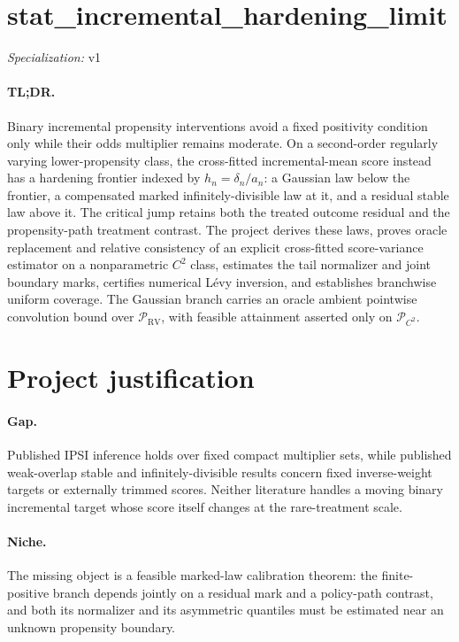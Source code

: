 \documentclass{article}
\begin{document}
\sloppy

\section*{stat\_\allowbreak{}incremental\_\allowbreak{}hardening\_\allowbreak{}limit}

\noindent\textit{Specialization:} v1\par

\paragraph{TL;DR.} Binary incremental propensity interventions avoid a fixed positivity condition only while their odds multiplier remains moderate. On a second-order regularly varying lower-propensity class, the cross-fitted incremental-mean score instead has a hardening frontier indexed by \(h_n=\delta_n/a_n\): a Gaussian law below the frontier, a compensated marked infinitely-divisible law at it, and a residual stable law above it. The critical jump retains both the treated outcome residual and the propensity-path treatment contrast. The project derives these laws, proves oracle replacement and relative consistency of an explicit cross-fitted score-variance estimator on a nonparametric \(C^2\) class, estimates the tail normalizer and joint boundary marks, certifies numerical Lévy inversion, and establishes branchwise uniform coverage. The Gaussian branch carries an oracle ambient pointwise convolution bound over \(\mathcal P_{\mathrm{RV}}\), with feasible attainment asserted only on \(\mathcal P_{C^2}\).

\section{Project justification}

\paragraph{Gap.} Published IPSI inference holds over fixed compact multiplier sets, while published weak-overlap stable and infinitely-divisible results concern fixed inverse-weight targets or externally trimmed scores. Neither literature handles a moving binary incremental target whose score itself changes at the rare-treatment scale.

\paragraph{Niche.} The missing object is a feasible marked-law calibration theorem: the finite-positive branch depends jointly on a residual mark and a policy-path contrast, and both its normalizer and its asymmetric quantiles must be estimated near an unknown propensity boundary.
\end{document}
